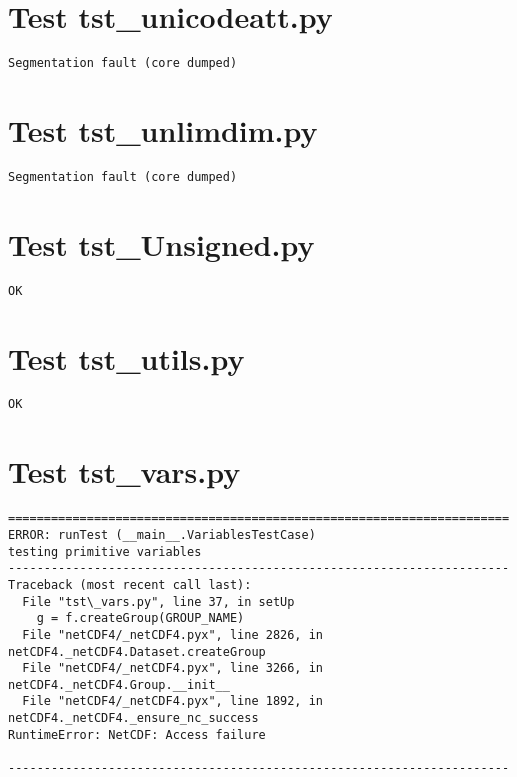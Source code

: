 \section{Test tst\_unicodeatt.py}

\begin{verbatim}
Segmentation fault (core dumped)
\end{verbatim}

\section{Test tst\_unlimdim.py}

\begin{verbatim}
Segmentation fault (core dumped)
\end{verbatim}

\section{Test tst\_Unsigned.py}

\begin{verbatim}
OK
\end{verbatim}

\section{Test tst\_utils.py}

\begin{verbatim}
OK
\end{verbatim}

\section{Test tst\_vars.py}

\begin{verbatim}
======================================================================
ERROR: runTest (__main__.VariablesTestCase)
testing primitive variables
----------------------------------------------------------------------
Traceback (most recent call last):
  File "tst\_vars.py", line 37, in setUp
    g = f.createGroup(GROUP_NAME)
  File "netCDF4/_netCDF4.pyx", line 2826, in netCDF4._netCDF4.Dataset.createGroup
  File "netCDF4/_netCDF4.pyx", line 3266, in netCDF4._netCDF4.Group.__init__
  File "netCDF4/_netCDF4.pyx", line 1892, in netCDF4._netCDF4._ensure_nc_success
RuntimeError: NetCDF: Access failure

----------------------------------------------------------------------
\end{verbatim}

